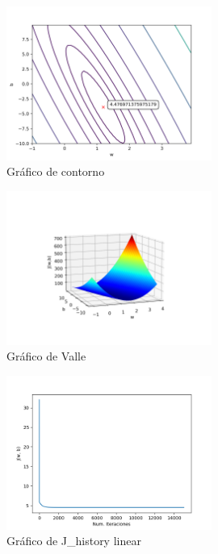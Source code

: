 \documentclass[6pt]{AiTex}
\begin{document}
\begin{figure}[H]
    \centering
    \includegraphics[width=0.6\textwidth]{imagenes/contour_plot.png}
    \caption{Gráfico de contorno}
    \label{fig:contour}
\end{figure}

\begin{figure}[H]
    \centering
    \includegraphics[width=0.6\textwidth]{imagenes/mesh.png}
    \caption{Gráfico de Valle}
    \label{fig:mesh}
\end{figure}

\begin{figure}[H]
    \centering
    \includegraphics[width=0.6\textwidth]{imagenes/J_history_linear.png}
    \caption{Gráfico de J\_history linear}
    \label{fig:history_linear}
\end{figure}
\end{document}
